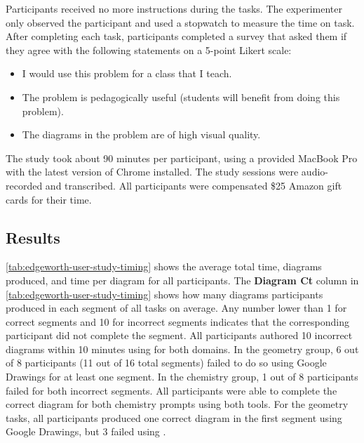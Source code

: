 Participants received no more instructions during the tasks. The experimenter only observed the participant and used a stopwatch to measure the time on task. After completing each task, participants completed a survey that asked them if they agree with the following statements on a 5-point Likert scale:

\begin{itemize}
  \item I would use this problem for a class that I teach.
  \item The problem is pedagogically useful (\ie students will benefit from doing this problem).  
  \item The diagrams in the problem are of high visual quality.
\end{itemize}

The study took about 90 minutes per participant, using a provided MacBook Pro with the latest version of Chrome installed. The study sessions were audio-recorded and transcribed. All participants were compensated \$25 Amazon gift cards for their time.

\subsection{Results}

\cref{tab:edgeworth-user-study-timing} shows the average total time, diagrams produced, and time per diagram for all participants. The \textbf{Diagram Ct} column in \cref{tab:edgeworth-user-study-timing} shows how many diagrams participants produced in each segment of all tasks on average. Any number lower than 1 for correct segments and 10 for incorrect segments indicates that the corresponding participant did not complete the segment. 
All participants authored 10 incorrect diagrams within 10 minutes using \Edgeworth for both domains. In the geometry group, 6 out of 8 participants (11 out of 16 total segments) failed to do so using Google Drawings for at least one segment. In the chemistry group, 1 out of 8 participants failed for both incorrect segments. All participants were able to complete the correct diagram for both chemistry prompts using both tools. For the geometry tasks, all participants produced one correct diagram in the first segment using Google Drawings, but 3 failed using \Penrose. 

